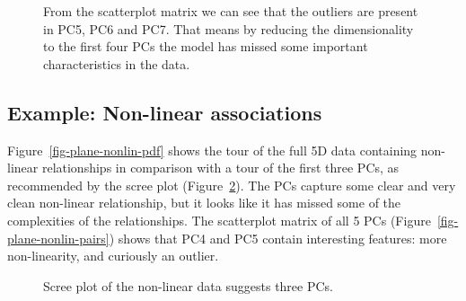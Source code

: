\documentclass[
  letterpaper,
]{krantz}
\begin{document}
\begin{figure}


\caption{\label{fig-plane-o-n-pairs}From the scatterplot matrix we can
see that the outliers are present in PC5, PC6 and PC7. That means by
reducing the dimensionality to the first four PCs the model has missed
some important characteristics in the data.}

\end{figure}%

\subsection{Example: Non-linear
associations}\label{example-non-linear-associations}


Figure~\ref{fig-plane-nonlin-pdf} shows the tour of the full 5D data
containing non-linear relationships in comparison with a tour of the
first three PCs, as recommended by the scree plot
(Figure~\ref{fig-plane-nonlin-scree}). The PCs capture some clear and
very clean non-linear relationship, but it looks like it has missed some
of the complexities of the relationships. The scatterplot matrix of all
5 PCs (Figure~\ref{fig-plane-nonlin-pairs}) shows that PC4 and PC5
contain interesting features: more non-linearity, and curiously an
outlier.

\begin{figure}


\caption{\label{fig-plane-nonlin-scree}Scree plot of the non-linear data
suggests three PCs.}

\end{figure}%
\end{document}
